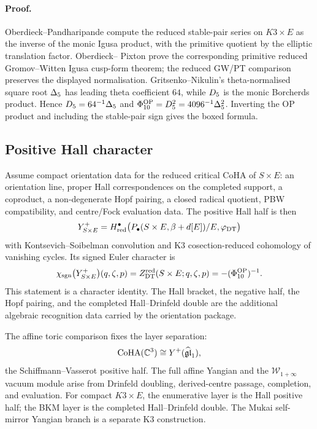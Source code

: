 \paragraph{Proof.}
Oberdieck--Pandharipande compute the reduced stable-pair series on
$K3\times E$ as the inverse of the monic Igusa product, with the
primitive quotient by the elliptic translation factor.  Oberdieck--
Pixton prove the corresponding primitive reduced Gromov--Witten Igusa
cusp-form theorem; the reduced GW/PT comparison preserves the displayed
normalisation.  Gritsenko--Nikulin's theta-normalised square root
$\Delta_5$ has leading theta coefficient $64$, while $D_5$ is the
monic Borcherds product.  Hence $D_5=64^{-1}\Delta_5$ and
$\Phi_{10}^{\mathrm{OP}}=D_5^2=4096^{-1}\Delta_5^2$.  Inverting the OP product and
including the stable-pair sign gives the boxed formula.

\subsection*{Positive Hall character}

Assume compact orientation data for the reduced critical CoHA of
$S\times E$: an orientation line, proper Hall correspondences on the
completed support, a coproduct, a non-degenerate Hopf pairing, a
closed radical quotient, PBW compatibility, and centre/Fock evaluation
data.  The positive Hall half is then
\[
  Y^{+}_{S\times E}
  =
  H^\bullet_{\mathrm{red}}
  \bigl(P_\bullet(S\times E,\beta+d[E])/E,\varphi_{\mathrm{DT}}\bigr)
\]
with Kontsevich--Soibelman convolution and K3 cosection-reduced
cohomology of vanishing cycles.  Its signed Euler character is
\[
  \chi_{\mathrm{sgn}}\bigl(Y^{+}_{S\times E}\bigr)(q,\zeta,p)
  =
  Z^{\mathrm{red}}_{\mathrm{DT}}(S\times E;q,\zeta,p)
  =
  -(\Phi_{10}^{\mathrm{OP}})^{-1}.
\]
This statement is a character identity.  The Hall bracket, the
negative half, the Hopf pairing, and the completed Hall--Drinfeld
double are the additional algebraic recognition data carried by the
orientation package.

The affine toric comparison fixes the layer separation:
\[
  \operatorname{CoHA}(\mathbb C^3)\cong Y^{+}(\widehat{\mathfrak{gl}}_1),
\]
the Schiffmann--Vasserot positive half.  The full affine Yangian and
the $\mathcal W_{1+\infty}$ vacuum module arise from Drinfeld doubling,
derived-centre passage, completion, and evaluation.  For compact
$K3\times E$, the enumerative layer is the Hall positive half; the BKM
layer is the completed Hall--Drinfeld double.  The Mukai self-mirror
Yangian branch is a separate K3 construction.

